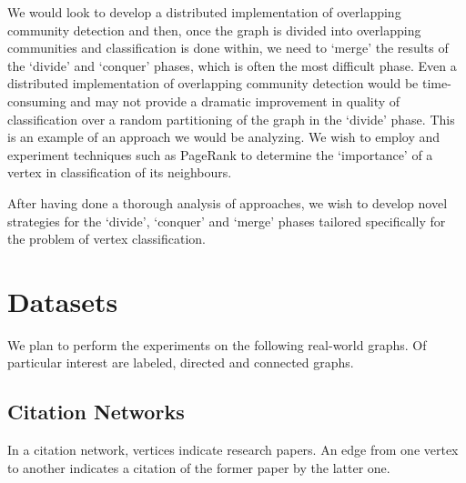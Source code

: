 \documentclass{article}
\begin{document}
We would look to develop a distributed implementation of overlapping community detection and then, once the graph is divided into overlapping communities and classification is done within, we need to ‘merge’ the results of the ‘divide’ and ‘conquer’ phases, which is often the most difficult phase. Even a distributed implementation of overlapping community detection would be time-consuming and may not provide a dramatic improvement in quality of classification over a random partitioning of the graph in the ‘divide’ phase. This is an example of an approach we would be analyzing. We wish to employ and experiment techniques such as PageRank to determine the ‘importance’ of a vertex in classification of its neighbours.

After having done a thorough analysis of approaches, we wish to develop novel strategies for the ‘divide’, ‘conquer’ and ‘merge’ phases tailored specifically for the problem of vertex classification.  

\section*{Datasets}
We plan to perform the experiments on the following real-world graphs. Of particular interest are labeled, directed and connected graphs.

\subsection*{Citation Networks}
 In a citation network, vertices indicate research papers. An edge from one vertex to another indicates a citation of the former paper by the latter one.
\end{document}
